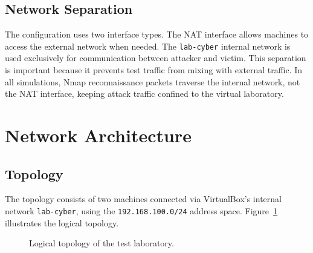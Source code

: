\subsection{Network Separation}

The configuration uses two interface types. The NAT interface allows machines to access the external network when needed. The \texttt{lab-cyber} internal network is used exclusively for communication between attacker and victim. This separation is important because it prevents test traffic from mixing with external traffic. In all simulations, Nmap reconnaissance packets traverse the internal network, not the NAT interface, keeping attack traffic confined to the virtual laboratory.

\section{Network Architecture}

\subsection{Topology}

The topology consists of two machines connected via VirtualBox's internal network \texttt{lab-cyber}, using the \texttt{192.168.100.0/24} address space. Figure~\ref{fig:topologie-logique} illustrates the logical topology.

\begin{figure}[H]
\centering
{}
\caption{Logical topology of the test laboratory.}
\label{fig:topologie-logique}
\end{figure}


